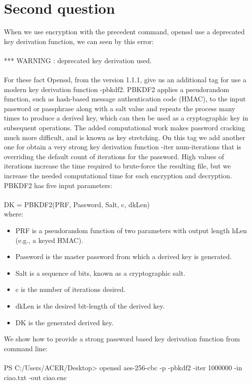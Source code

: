 \documentclass{article}
\begin{document}
\section{Second question}
When we use encryption with the precedent command, openssl use a deprecated key derivation function, we can seen by this error:\\\\
*** WARNING : deprecated key derivation used.\\\\
For these fact Openssl, from the version 1.1.1, give us an additional tag for use a modern key derivation function -pbkdf2. PBKDF2 applies a pseudorandom function, such as hash-based message authentication code (HMAC), to the input password or passphrase along with a salt value and repeats the process many times to produce a derived key, which can then be used as a cryptographic key in subsequent operations. The added computational work makes password cracking much more difficult, and is known as key stretching. On this tag we add another one for obtain a very strong key derivation function -iter num-iterations that is overriding the default count of iterations for the password. High values of iterations increase the time required to brute-force the resulting file, but we increase the needed computational time for each encryption and decryption. PBKDF2 has five input parameters:\\
\\
DK = PBKDF2(PRF, Password, Salt, c, dkLen)\\
where:
\begin{itemize}
\item PRF is a pseudorandom function of two parameters with output length hLen (e.g., a keyed HMAC).
\item Password is the master password from which a derived key is generated.
\item Salt is a sequence of bits, known as a cryptographic salt.
\item c is the number of iterations desired.
\item dkLen is the desired bit-length of the derived key.
\item DK is the generated derived key.
\end{itemize}
We show how to provide a strong password based key derivation function from command line:\\\\
PS C:/Users/ACER/Desktop> openssl aes-256-cbc -p -pbkdf2 -iter 1000000 -in ciao.txt -out ciao.enc\\
\end{document}
